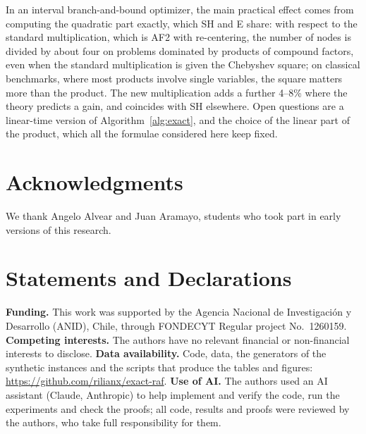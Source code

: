 \documentclass[10pt]{article}
\theoremstyle{definition}
\begin{document}
In an interval branch-and-bound optimizer, the main practical effect comes from computing the quadratic part exactly, which SH and E share: with respect to the standard multiplication, which is AF2 with re-centering, the number of nodes is divided by about four on problems dominated by products of compound factors, even when the standard multiplication is given the Chebyshev square; on classical benchmarks, where most products involve single variables, the square matters more than the product. The new multiplication adds a further 4--8\% where the theory predicts a gain, and coincides with SH elsewhere. Open questions are a linear-time version of Algorithm~\ref{alg:exact}, and the choice of the linear part of the product, which all the formulae considered here keep fixed.

\section*{Acknowledgments}
We thank Angelo Alvear and Juan Aramayo, students who took part in early versions of this research.

\section*{Statements and Declarations}
\textbf{Funding.} This work was supported by the Agencia Nacional de Investigaci\'on y Desarrollo (ANID), Chile, through FONDECYT Regular project No.~1260159.
\textbf{Competing interests.} The authors have no relevant financial or non-financial interests to disclose.
\textbf{Data availability.} Code, data, the generators of the synthetic instances and the scripts that produce the tables and figures: \url{https://github.com/rilianx/exact-raf}.
\textbf{Use of AI.} The authors used an AI assistant (Claude, Anthropic) to help implement and verify the code, run the experiments and check the proofs; all code, results and proofs were reviewed by the authors, who take full responsibility for them.



\end{document}
